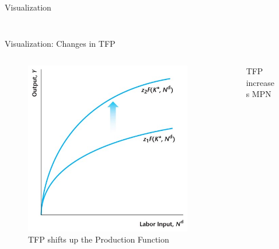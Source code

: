 \documentclass[11pt,aspectratio=43]{beamer} \usepackage[utf8]{inputenc}
\theoremstyle{definition}
\begin{document}
\begin{frame}{Visualization}
\begin{columns}
\begin{column}{0.5\textwidth}
\begin{figure}
        \end{figure}
    \end{column}
\end{columns}
\end{frame}

\begin{frame}{Visualization: Changes in TFP}
\label{slide:Visualization__Changes_in_TFP}
\begin{columns}
    \begin{column}{0.5\textwidth}
        \begin{figure}
            \caption{TFP shifts up the Production Function}
            \includegraphics[width=\textwidth]{./figures/Figure4_16.jpg}
        \end{figure}
    \end{column}
    \begin{column}{0.5\textwidth}
        \begin{figure}
            \caption{TFP increases MPN}

\end{figure}
\end{column}
\end{columns}
\end{frame}
\end{document}
